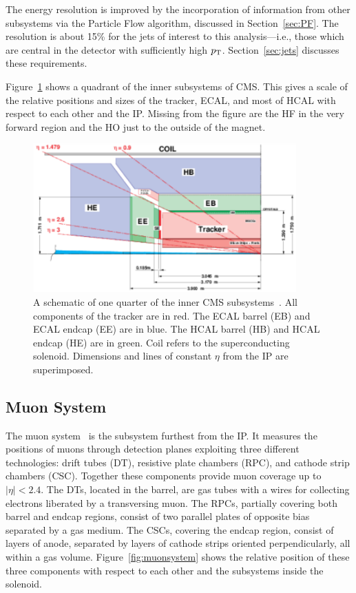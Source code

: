 The energy resolution is improved by the incorporation of information from other subsystems via
the Particle Flow algorithm, discussed in Section~\ref{sec:PF}.
The resolution is about 15\% for the jets of interest to this analysis---i.e., those which are central 
in the detector with
sufficiently high $p_{\rm T}$. Section~\ref{sec:jets} discusses these requirements.

Figure~\ref{fig:subsystems_inner} shows a quadrant of the inner subsystems of CMS. This gives
a scale of the relative positions and sizes of the tracker, ECAL,
and most of HCAL with respect to each other and the IP. Missing from the figure are the HF
in the very forward region and the HO just to the outside of
the magnet.

\begin{figure}[ht]
 \begin{center}
   \includegraphics[width=0.90\textwidth]{figures/experiment/subsystems_inner.pdf}
      \end{center}
\caption{A schematic of one quarter of the inner CMS subsystems~\cite{ecaltdr}.
All components of the tracker are in red. The ECAL barrel (EB) and ECAL endcap (EE) are in blue.
The HCAL barrel (HB) and HCAL endcap (HE) are in green. Coil refers to the superconducting solenoid.
Dimensions and lines of constant $\eta$ from the IP are superimposed.}
\label{fig:subsystems_inner}
\end{figure}


\subsection{Muon System\label{subsec:muonsystem}}

The muon system~\cite{muontdr} is the subsystem furthest from the IP. It measures the positions
of muons through detection planes exploiting three different technologies:
drift tubes (DT), resistive plate chambers (RPC), and cathode strip chambers (CSC).
Together these components provide muon coverage up to $|\eta|< 2.4$.
The DTs, located in the barrel, are gas tubes with a wires for collecting electrons liberated
by a transversing muon. The RPCs, partially covering both barrel and endcap regions, consist
of two parallel plates of opposite bias separated by a gas medium. The CSCs, covering the endcap region,
consist of layers of anode, separated by layers of cathode strips oriented perpendicularly, all
within a gas volume. Figure~\ref{fig:muonsystem} shows the relative position of these three components with respect to each other and the subsystems inside the solenoid.

